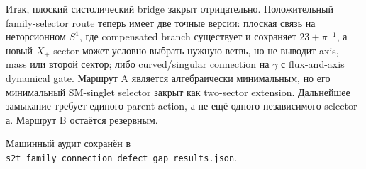 Итак, плоский систолический bridge закрыт отрицательно. Положительный
family-selector route теперь имеет две точные версии: плоская связь на
неторсионном \(S^1\), где compensated branch существует и сохраняет
\(23+\pi^{-1}\), а новый \(X_\pm\)-sector может условно выбрать нужную ветвь,
но не выводит axis, mass или второй сектор; либо curved/singular
connection на \(\gamma\) с flux-and-axis dynamical gate. Маршрут A является
алгебраически минимальным, но его минимальный SM-singlet selector закрыт как
two-sector extension. Дальнейшее замыкание требует единого parent action, а
не ещё одного независимого selector-а. Маршрут B остаётся резервным.

Машинный аудит сохранён в
\texttt{s2t\_family\_connection\_defect\_gap\_results.json}.